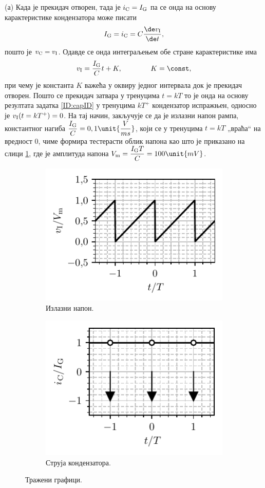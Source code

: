 (а) Када је прекидач отворен, тада је $i_{\rm C} = I_{\rm G}$ па се онда на основу карактеристике кондензатора 
може писати 
\begin{equation}
    I_{\rm G} = i_{\rm C} = C \dfrac{\de v_{\rm I}}{\de t},  \label{\ID.cchar}
\end{equation}
 пошто је $v_{\rm C} = v_{\rm I}$. Одавде се онда интеграљењем обе 
стране карактеристике има 
\begin{eqnarray}
    v_{\rm I} = \dfrac{I_{\rm G}}{C} t + K, \qquad\qquad K = \const, \label{\ID.eqvin}
\end{eqnarray}
при чему је константа $K$ важећа у оквиру једног интервала док је прекидач отворен. 
Пошто се прекидач затвара у тренуцима $t = kT$ то је онда 
на основу резултата задатка \ref{ID:capID}
у тренуцима $kT^+$ кондензатор испражњен, односно је 
$v_{\rm I}(t = kT^+) = 0$. На тај начин, закључује се да је излазни напон рампа, константног нагиба 
$\dfrac{I_{\rm G}}{C} = 0,1 \unit{\dfrac{V}{ms}}$, који се у тренуцима $t = kT$ „враћа“ на вредност 0, чиме формира тестерасти облик напона 
као што је приказано на слици \ref{\ID.vi}, где је амплитуда напона
$V_{\rm m} = \dfrac{I_{\rm G} T}{C} = 100\unit{mV}$. 
%
\begin{figure}[ht!]
    \centering
        \begin{subfigure}[c]{0.45\textwidth}
            \centering
            \includegraphics[scale=1]
            {fig/zCpi_vi.pdf}
            \caption{Излазни напон.}
            \label{\ID.vi}
        \end{subfigure}
        \begin{subfigure}[c]{0.45\textwidth}
            \centering
            \includegraphics[scale=1]
            {fig/zCpi_ic.pdf}
            \caption{Струја кондензатора.}
            \label{\ID.ic}
        \end{subfigure}
    \caption{Тражени графици.}
\end{figure}
